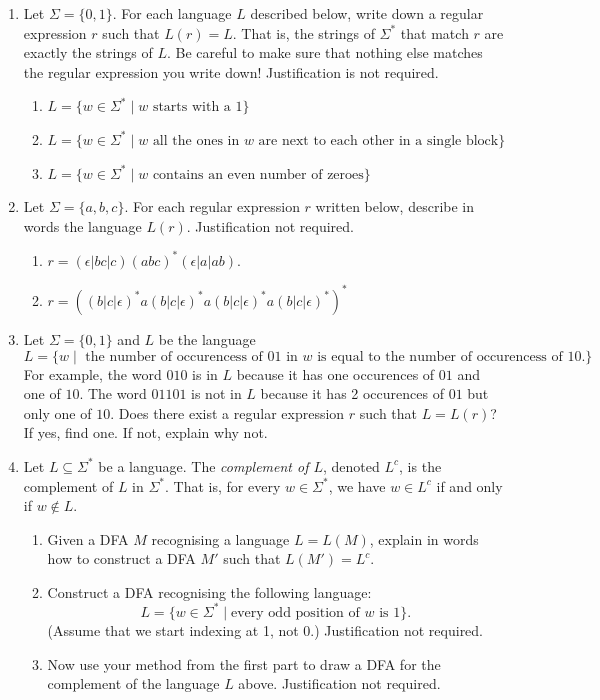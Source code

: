 \documentclass{amsart}
\begin{document}
\begin{enumerate}
\item Let \(\Sigma = \{0,1\}\). For each language \(L\) described below, write down a regular expression \(r\) such that \(L(r) = L\).
That is, the strings of \(\Sigma^*\) that match \(r\) are exactly the strings of \(L\).
Be careful to make sure that nothing else matches the regular expression you write down!
Justification is not required.
\begin{enumerate}
\item \(L = \{w \in \Sigma^\ast \mid w \text{ starts with a }1\}\)
\item \(L = \{w \in \Sigma^* \mid w \text{ all the ones in }w\text{ are next to each other in a single block}\}\)
\item \(L = \{w \in \Sigma^\ast \mid w \text{ contains an even number of zeroes}\}\)
\end{enumerate}

\item Let \(\Sigma = \{a,b,c\}\). For each regular expression \(r\) written below, describe in words the language \(L(r)\).
Justification not required.
\begin{enumerate}
\item \(r = (\epsilon|bc|c)(abc)^*(\epsilon|a|ab)\).
\item \(r = ((b|c|\epsilon)^*a(b|c|\epsilon)^*a(b|c|\epsilon)^*a(b|c|\epsilon)^*)^*\)
\end{enumerate}

\item Let \(\Sigma = \{0,1\}\) and \(L\) be the language
\[ L = \{w \mid \text{ the number of occurencess of }01\text{ in } w\text{ is equal to the number of occurencess of } 10.\}\]
For example, the word \(010\) is in \(L\) because it has one occurences of \(01\) and one of \(10\).
The word \(01101\) is not in \(L\) because it has 2 occurences of \(01\) but only one of \(10\).
Does there exist a regular expression \(r\) such that \(L = L(r)\)?
If yes, find one.
If not, explain why not.

\item Let \(L \subseteq \Sigma^\ast\) be a language. The \emph{complement of \(L\)}, denoted \(L^c\), is the complement of \(L\) in \(\Sigma^\ast\).
That is, for every \(w \in \Sigma^\ast\), we have \(w \in L^c\) if and only if \(w \notin L\).
\begin{enumerate}
\item Given a DFA \(M\) recognising a language \(L = L(M)\), explain in words how to construct a DFA \(M'\) such that \(L(M') = L^c\).

\item Construct a DFA recognising the following language:
\[L = \{w \in \Sigma^* \mid \text{every odd position of }w\text{ is }1\}.\]
(Assume that we start indexing at 1, not 0.)
Justification not required.

\item Now use your method from the first part to draw a DFA for the complement of the language \(L\) above. Justification not required.
\end{enumerate}
\end{enumerate}
\end{document}
